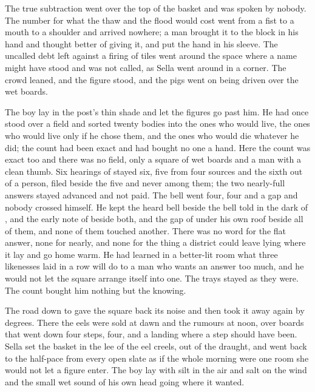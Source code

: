 The true subtraction went over the top of the basket and was spoken by nobody. The number for what the thaw and the flood would cost went from a fist to a mouth to a shoulder and arrived nowhere; a man brought it to the block in his hand and thought better of giving it, and put the hand in his sleeve. The uncalled debt  left against a firing of tiles went around the space where a name might have stood and was not called, as Sella went around  in a corner. The crowd leaned, and the figure stood, and the pigs went on being driven over the wet boards.

The boy lay in the post's thin shade and let the figures go past him. He had once stood over a field and sorted twenty bodies into the ones who would live, the ones who would live only if he chose them, and the ones who would die whatever he did; the count had been exact and had bought no one a hand. Here the count was exact too and there was no field, only a square of wet boards and a man with a clean thumb. Six hearings of  stayed six, five from four sources and the sixth out of a person, filed beside the five and never among them; the two nearly-full answers stayed advanced and not paid. The bell went four, four and a gap and nobody crossed himself. He kept the heard bell beside the bell told in the dark of , and the early note of  beside both, and the gap of  under his own roof beside all of them, and none of them touched another. There was no  word for the flat answer, none for nearly, and none for the thing a district could leave lying where it lay and go home warm. He had learned in a better-lit room what three likenesses laid in a row will do to a man who wants an answer too much, and he would not let the square arrange itself into one. The trays stayed as they were. The count bought him nothing but the knowing.

The road down to  gave the square back its noise and then took it away again by degrees. There the eels were sold at dawn and the rumours at noon, over boards that went down four steps, four, and a landing where a step should have been. Sella set the basket in the lee of the eel creels, out of the draught, and went back to the half-pace from every open slate as if the whole morning were one room she would not let a figure enter. The boy lay with silt in the air and salt on the wind and the small wet sound of his own head going where it wanted.

